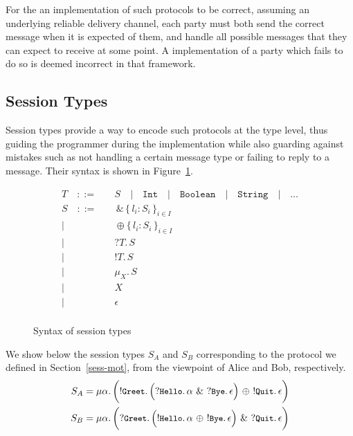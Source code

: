 \documentclass[a4paper,twoside]{article}
\newcommand{\RefSec}[1]{Section~\ref{#1}}
\newcommand{\RefFig}[1]{Figure~\ref{#1}}
\newcommand{\stt}[1]{\texttt{\small{#1}}}
\begin{document}
For the an implementation of such protocols to be correct, assuming an underlying reliable delivery channel, each party must both send the correct message when it is expected of them, and handle all possible messages that they can expect to receive at some point. A implementation of a party which fails to do so is deemed incorrect in that framework.

\subsection{Session Types}

Session types \cite{Honda:1998:LPT:645392.651876} provide a way to encode such protocols at the type level, thus guiding the programmer during the implementation while also guarding against mistakes such as not handling a certain message type or failing to reply to a message. Their syntax is shown in \RefFig{fig:sess-syntax}.

\begin{figure}
\begin{align*}
T\quad::=&\quad 	S
   \quad|\quad \texttt{Int}
   \quad|\quad \texttt{Boolean}
   \quad|\quad \texttt{String}
   \quad|\quad \ldots \tag*{payload}
\\
S\quad::=&\quad 	\,\&\,\{\,l_i: S_i\,\}_{i\in I}			\tag*{branching}\\
        |&\quad 	\oplus\{\,l_i: S_i\,\}_{i\in I}			\tag*{selection}\\
		|&\quad 	?T.\, S									\tag*{receive}\\
		|&\quad 	!T.\, S									\tag*{send}\\
        |&\quad		\mu_X.\, S								\tag*{recursion}\\
        |&\quad 	X  										\tag*{variable}\\
        |&\quad 	\epsilon								\tag*{termination}\\
\end{align*}
\vspace{-20pt}
\caption{Syntax of session types \label{fig:sess-syntax}}
\end{figure}

We show below the session types $S_A$ and $S_B$ corresponding to the protocol we defined in \RefSec{sess-mot}, from the viewpoint of Alice and Bob, respectively.
\begin{align*}
S_A &= \mu\alpha.\,\bigg(!\stt{Greet}.\,\Big(?\stt{Hello}.\,\alpha\ \&\ ?\stt{Bye}.\, \epsilon \Big)\ \oplus\ !\stt{Quit}.\,\epsilon \bigg)\\
S_B &= \mu\alpha.\,\bigg(?\stt{Greet}.\,\Big(!\stt{Hello}.\,\alpha\ \oplus\ !\stt{Bye}.\, \epsilon \Big)\ \&\ ?\stt{Quit}.\,\epsilon \bigg)\\
\end{align*}
\vspace{-30pt}
\end{document}
